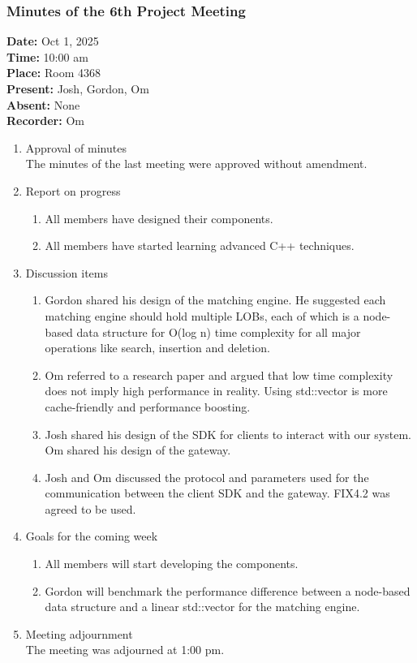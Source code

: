 \documentclass[12pt,a4paper]{article}
\begin{document}
\subsubsection{Minutes of the 6th Project Meeting}
\textbf{Date:} Oct 1, 2025\\
\textbf{Time:} 10:00 am\\
\textbf{Place:} Room 4368\\
\textbf{Present:} Josh, Gordon, Om\\
\textbf{Absent:} None\\
\textbf{Recorder:} Om

\begin{enumerate}
\item Approval of minutes\\
The minutes of the last meeting were approved without amendment.\\
\item Report on progress
\begin{enumerate}
\item All members have designed their components.\\
\item All members have started learning advanced C++ techniques.\\
\end{enumerate}
\item Discussion items
\begin{enumerate}
\item Gordon shared his design of the matching engine. He suggested each matching engine should hold multiple LOBs, each of which is a node-based data structure for O(log n) time complexity for all major operations like search, insertion and deletion.\\
\item Om referred to a research paper and argued that low time complexity does not imply high performance in reality. Using std::vector is more cache-friendly and performance boosting.\\
\item Josh shared his design of the SDK for clients to interact with our system. Om shared his design of the gateway.\\
\item Josh and Om discussed the protocol and parameters used for the communication between the client SDK and the gateway. FIX4.2 was agreed to be used.\\
\end{enumerate}
\item Goals for the coming week
\begin{enumerate}
\item All members will start developing the components.\\
\item Gordon will benchmark the performance difference between a node-based data structure and a linear std::vector for the matching engine.\\
\end{enumerate}
\item Meeting adjournment\\
The meeting was adjourned at 1:00 pm.
\end{enumerate}
\end{document}
